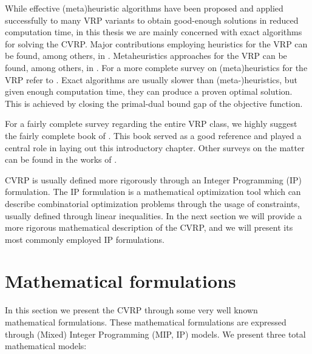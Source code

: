While effective (meta)heuristic algorithms have been proposed and applied
successfully to many VRP variants to obtain good-enough solutions
in reduced computation time, in this thesis we are mainly concerned
with exact algorithms for solving the CVRP.
Major contributions employing heuristics for the VRP can be found, among others, in
\textcite{clarke1964scheduling, desrochers1989matching, paessens1988savings, foster1976integer}.
Metaheuristics approaches for the VRP can be found, among others, in
\textcite{gendreau1994tabu, cordeau2012parallel, toth2003granular, li2005very, pisinger2007, kytojoki2007efficient, nagata2009,vidal2012, subramanian2013}.
For a more complete survey on (meta)heuristics for the VRP refer to
\textcite{golden1998impact,gendreau2002metaheuristics,gendreau2008,laporte2014chapter,elshaer2020taxonomic}.
Exact algorithms are usually slower than (meta-)heuristics, but given
enough computation time, they can produce a proven optimal solution.
This is achieved by closing the primal-dual bound gap of the objective function.

\medskip

For a fairly complete survey regarding the entire VRP class, we highly suggest
the fairly complete book  of \textcite{toth2014}.
This book served as a good reference and played a central role
in laying out this introductory chapter.
Other surveys on the matter can be found in the works of \textcite{baldacci2012, costa2019}.

\medskip


CVRP is usually defined more rigorously through an Integer Programming (IP) formulation.
The IP formulation is a mathematical optimization tool
which can describe combinatorial optimization problems
through the usage of constraints, usually defined through linear inequalities.
In the next section we will provide a more rigorous mathematical
description of the CVRP, and we will present its most commonly employed IP formulations.


\section{Mathematical formulations}
\label{sec:intro-cvrp-mathematical-formulations}

In this section we present the CVRP through some very well known mathematical formulations.
These mathematical formulations are expressed through (Mixed) Integer Programming (MIP, IP)
models.
We present three total mathematical models:

